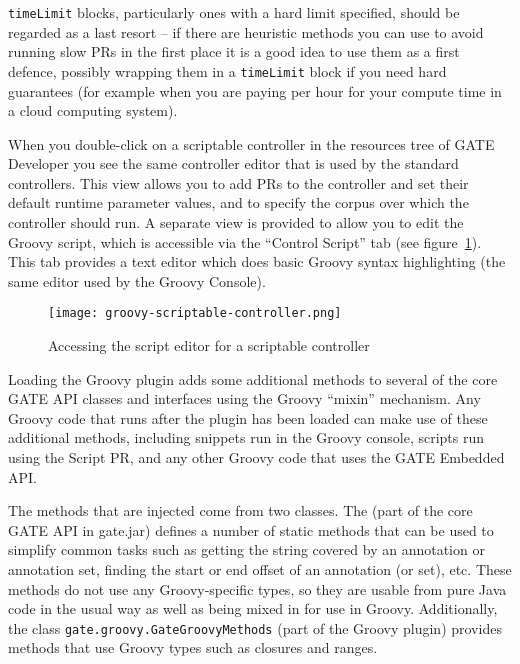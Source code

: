 {\tt timeLimit} blocks, particularly ones with a hard limit specified, should
be regarded as a last resort -- if there are heuristic methods you can use to
avoid running slow PRs in the first place it is a good idea to use them as a
first defence, possibly wrapping them in a {\tt timeLimit} block if you need
hard guarantees (for example when you are paying per hour for your compute time
in a cloud computing system).


When you double-click on a scriptable controller in the resources tree of GATE
Developer you see the same controller editor that is used by the standard
controllers.  This view allows you to add PRs to the controller and set their
default runtime parameter values, and to specify the corpus over which the
controller should run.  A separate view is provided to allow you to edit the
Groovy script, which is accessible via the ``Control Script'' tab (see
figure~\ref{fig:api:groovy:controller}).  This tab provides a text editor which
does basic Groovy syntax highlighting (the same editor used by the Groovy
Console).
\begin{figure}[tbp]
\begin{center}
\texttt{[image: groovy-scriptable-controller.png]}
\caption{Accessing the script editor for a scriptable controller}
\label{fig:api:groovy:controller}
\end{center}
\end{figure}


Loading the Groovy plugin adds some additional methods to several of the core
GATE API classes and interfaces using the Groovy ``mixin'' mechanism.  Any
Groovy code that runs after the plugin has been loaded can make use of these
additional methods, including snippets run in the Groovy console, scripts run
using the Script PR, and any other Groovy code that uses the GATE Embedded API.

The methods that are injected come from two classes.  The
(part of the core GATE API in gate.jar) defines a number of static methods that
can be used to simplify common tasks such as getting the string covered by an
annotation or annotation set, finding the start or end offset of an annotation
(or set), etc.  These methods do not use any Groovy-specific types, so they are
usable from pure Java code in the usual way as well as being mixed in for use
in Groovy.  Additionally, the class \verb|gate.groovy.GateGroovyMethods| (part
of the Groovy plugin) provides methods that use Groovy types such as closures
and ranges.

